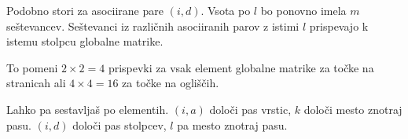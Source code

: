 Podobno stori za asociirane pare $(i, d)$. Vsota po $l$ bo ponovno imela $m$ seštevancev. Seštevanci iz različnih asociiranih parov z istimi $l$ prispevajo k istemu stolpcu globalne matrike.

To pomeni \(2 \times 2 = 4\) prispevki za vsak element globalne matrike za točke na stranicah ali $4 \times 4 = 16$ za točke na ogliščih.

Lahko pa sestavljaš po elementih. $(i, a)$ določi pas vrstic, $k$ določi mesto znotraj pasu. $(i, d)$ določi pas stolpcev, $l$ pa mesto znotraj pasu.